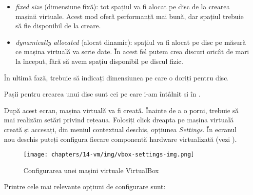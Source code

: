 \begin{itemize}
  \item \textit{fixed size} (dimensiune fixă): tot spațiul va fi alocat pe disc de
    la crearea mașinii virtuale. Acest mod oferă performanță mai
    bună, dar spațiul trebuie să fie disponibil de la creare.
  \item \textit{dynamically allocated} (alocat dinamic): spațiul va fi alocat pe
    disc pe măsură ce mașina virtuală va scrie date. În acest fel
    putem crea discuri oricât de mari la început, fără să avem
    spațiu disponibil pe discul fizic.
\end{itemize}

În ultimă fază, trebuie să indicați dimensiunea pe care o doriți pentru disc.

Pașii pentru crearea unui disc sunt cei pe care i-am întâlnit și în .

După acest ecran, mașina virtuală va fi creată. Înainte de a o porni,
trebuie să mai realizăm setări privind rețeaua. Folosiți click dreapta
pe mașina virtuală creată și accesați, din meniul contextual deschis, opțiunea \textit{Settings}. În ecranul
nou deschis puteți configura fiecare componentă hardware virtualizată (vezi
).

\begin{figure}[!htbp]
  \centering
  \texttt{[image: chapters/14-vm/img/vbox-settings-img.png]}
  \caption{Configurarea unei mașini virtuale VirtualBox}
  \label{fig:vm:vbox-settings}
\end{figure}

Printre cele mai relevante opțiuni de configurare sunt:

